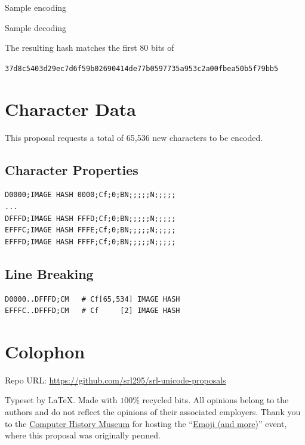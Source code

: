 \documentclass[12pt]{article}
\begin{document}
Sample encoding



Sample decoding



The resulting hash matches the first 80 bits of 

\small{\texttt{37d8c5403d29ec7d6f59b02690414de77b0597735a953c2a00fbea50b5f79bb5}}

\section{Character Data}

This proposal requests a total of 65,536 new characters to be encoded.

\subsection{Character Properties}

\begin{verbatim}
D0000;IMAGE HASH 0000;Cf;0;BN;;;;;N;;;;;
...
DFFFD;IMAGE HASH FFFD;Cf;0;BN;;;;;N;;;;;
EFFFC;IMAGE HASH FFFE;Cf;0;BN;;;;;N;;;;;
EFFFD;IMAGE HASH FFFF;Cf;0;BN;;;;;N;;;;;
\end{verbatim}

\subsection{Line Breaking}

\begin{verbatim}
D0000..DFFFD;CM   # Cf[65,534] IMAGE HASH                                                                                                                                         
EFFFC..DFFFD;CM   # Cf     [2] IMAGE HASH                                                                                                                                         
\end{verbatim}





{}
\printbibliography
\section*{Colophon}

Repo URL: \small\url{https://github.com/srl295/srl-unicode-proposals} 


Typeset by \LaTeX . Made with \( 100\%  \) recycled bits. All opinions belong to the authors and do not reflect the opinions
of their associated employers. Thank you to the \href{http://www.computerhistory.org}{Computer History Museum} 
for hosting the ``\href{https://www.facebook.com/events/1727012724179335/}{Emoji (and more)}'' event, where this proposal was originally penned. 
\end{document}

